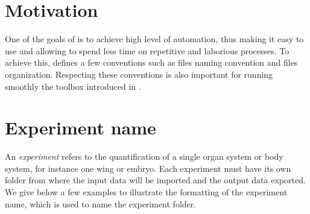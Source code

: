 \section{Motivation}
One of the goals of \wingj is to achieve high level of automation, thus making it easy to use and allowing to spend less time on repetitive and laborious processes. To achieve this, \wingj defines a few conventions such as files naming convention and files organization. Respecting these conventions is also important for running smoothly the \wingj \matlab toolbox introduced in .


\section{Experiment name}\label{sec:experiment_name}
An \textit{experiment} refers to the quantification of a single organ system or body system, for instance one \droso wing or embryo. Each experiment must have its own folder from where the input data will be imported and the output data exported. We give below a few examples to illustrate the formatting of the experiment name, which is used to name the experiment folder.

